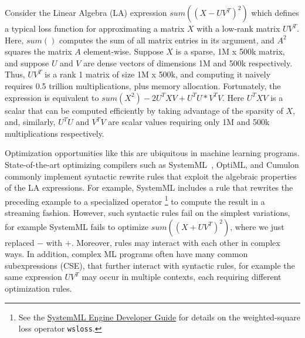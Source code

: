 Consider the Linear Algebra (LA) expression $sum((X-UV^T)^2)$ which
defines a typical loss function for approximating a matrix $X$ with a
low-rank matrix $UV^T$. Here, $sum()$ computes the sum of all matrix
entries in its argument, and $A^2$ squares the matrix $A$
element-wise. Suppose $X$ is a sparse, 1M x 500k matrix, and suppose
$U$ and $V$ are dense vectors of dimensions 1M and 500k respectively.
Thus, $UV^T$ is a rank 1 matrix of size 1M x 500k, and computing it
naively requires 0.5 trillion multiplications, plus memory allocation.
Fortunately, the expression is equivalent to
$sum(X^2) - 2U^TXV + U^TU * V^TV$.  Here $U^TXV$ is a scalar that can
be computed efficiently by taking advantage of the sparsity of $X$,
and, similarly, $U^TU$ and $V^TV$ are scalar values requiring only 1M
and 500k multiplications respectively.

Optimization opportunities like this are ubiquitous in machine
learning programs. State-of-the-art optimizing compilers such as
SystemML~\cite{DBLP:reference/bdt/Boehm19},
OptiML\cite{DBLP:conf/icml/SujeethLBRCWAOO11}, and
Cumulon\cite{DBLP:conf/sigmod/HuangB013} commonly implement syntactic
rewrite rules that exploit the algebraic properties of the LA
expressions. For example, SystemML includes a rule that rewrites the
preceding example to a specialized operator \footnote{See the
  \href{https://systemml.apache.org/docs/0.12.0/engine-dev-guide.html}{SystemML
    Engine Developer Guide} for details on the weighted-square loss
  operator \texttt{wsloss}. } to compute the result in a streaming
fashion.  However, such syntactic rules fail on the simplest
variations, for example SystemML fails to optimize $sum((X+UV^T)^2)$,
where we just replaced $-$ with $+$.  Moreover, rules may interact
with each other in complex ways.  In addition, complex ML programs
often have many common subexpressions (CSE), that further interact
with syntactic rules, for example the same expression $UV^T$ may occur
in multiple contexts, each requiring different optimization rules.


